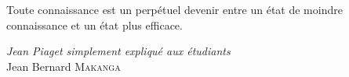 \vfill
\epigraph{Toute connaissance est un perpétuel devenir entre un état de moindre connaissance et un état plus efficace.}{\emph{Jean Piaget simplement expliqué aux étudiants}\\ Jean Bernard \textsc{Makanga}}